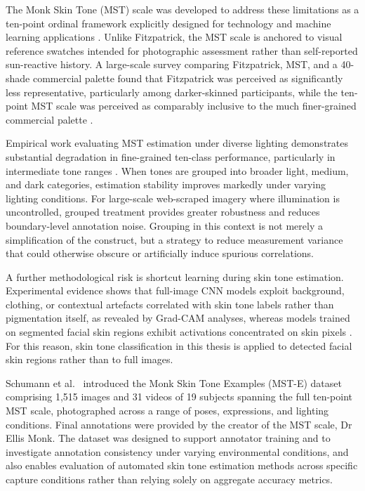 The Monk Skin Tone (MST) scale was developed to address these limitations as a ten-point ordinal framework explicitly designed for technology and machine learning applications \cite{Schumann_2024_MonkSkinTone}. Unlike Fitzpatrick, the MST scale is anchored to visual reference swatches intended for photographic assessment rather than self-reported sun-reactive history. A large-scale survey comparing Fitzpatrick, MST, and a 40-shade commercial palette found that Fitzpatrick was perceived as significantly less representative, particularly among darker-skinned participants, while the ten-point MST scale was perceived as comparably inclusive to the much finer-grained commercial palette \cite{Heldreth_2024_WhichSkinToneMeasures}.

Empirical work evaluating MST estimation under diverse lighting demonstrates substantial degradation in fine-grained ten-class performance, particularly in intermediate tone ranges \cite{Mbatha_2024_SkinToneLighting}. When tones are grouped into broader light, medium, and dark categories, estimation stability improves markedly under varying lighting conditions. For large-scale web-scraped imagery where illumination is uncontrolled, grouped treatment provides greater robustness and reduces boundary-level annotation noise. Grouping in this context is not merely a simplification of the construct, but a strategy to reduce measurement variance that could otherwise obscure or artificially induce spurious correlations.

A further methodological risk is shortcut learning during skin tone estimation. Experimental evidence shows that full-image CNN models exploit background, clothing, or contextual artefacts correlated with skin tone labels rather than pigmentation itself, as revealed by Grad-CAM analyses, whereas models trained on segmented facial skin regions exhibit activations concentrated on skin pixels \cite{Matias_2024_EnhancingFairnessMST}. For this reason, skin tone classification in this thesis is applied to detected facial skin regions rather than to full images.

Schumann et al.~\cite{Schumann_2024_MonkSkinTone} introduced the Monk Skin Tone Examples (MST-E) dataset comprising 1,515 images and 31 videos of 19 subjects spanning the full ten-point MST scale, photographed across a range of poses, expressions, and lighting conditions. Final annotations were provided by the creator of the MST scale, Dr Ellis Monk. The dataset was designed to support annotator training and to investigate annotation consistency under varying environmental conditions, and also enables evaluation of automated skin tone estimation methods across specific capture conditions rather than relying solely on aggregate accuracy metrics.

